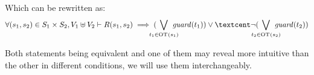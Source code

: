 \documentclass[runningheads]{llncs}
\begin{document}
Which can be rewritten as:
\[
\forall \mpar{s_1, s_2} \in S_1 \times S_2, V_1 \uplus V_2  \vdash R\mpar{s_1, s_2} \implies( \bigvee_\subbox{t_1 \in \fOT{s_1}} \fguard{t_1} ) \lor¢ \lnot( \bigvee_\subbox{t_2 \in \fOT{s_2}} \fguard{t_2}  )
\]

Both statements being equivalent and one of them may reveal more intuitive than the other in different conditions, we will use them interchangeably.
%
%
\end{document}
